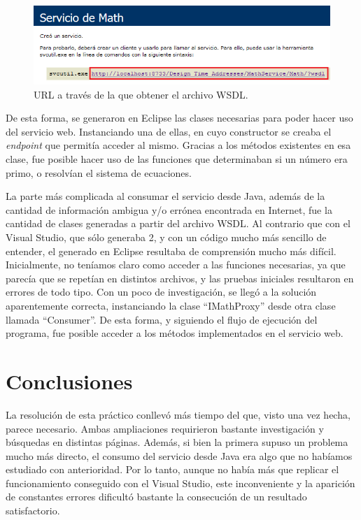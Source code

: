 \documentclass[a4paper,openright,10pt]{article}
\begin{document}
\begin{figure}[H]
	\centering
	\includegraphics[width=12cm]{URL.png}
	\caption{URL a través de la que obtener el archivo WSDL.}
	\label{fig:URL}
\end{figure}

De esta forma, se generaron en Eclipse las clases necesarias para poder hacer uso del servicio web. Instanciando una de ellas, en cuyo constructor se creaba el \textit{endpoint} que permitía acceder al mismo. Gracias a los métodos existentes en esa clase, fue posible hacer uso de las funciones que determinaban si un número era primo, o resolvían el sistema de ecuaciones.

La parte más complicada al consumar el servicio desde Java, además de la cantidad de información ambigua y/o errónea encontrada en Internet, fue la cantidad de clases generadas a partir del archivo WSDL. Al contrario que con el Visual Studio, que sólo generaba 2, y con un código mucho más sencillo de entender, el generado en Eclipse resultaba de comprensión mucho más difícil. Inicialmente, no teníamos claro como acceder a las funciones necesarias, ya que parecía que se repetían en distintos archivos, y las pruebas iniciales resultaron en errores de todo tipo. Con un poco de investigación, se llegó a la solución aparentemente correcta, instanciando la clase ``IMathProxy'' desde otra clase llamada ``Consumer''. De esta forma, y siguiendo el flujo de ejecución del programa, fue posible acceder a los métodos implementados en el servicio web.


\section{Conclusiones}

La resolución de esta práctico conllevó más tiempo del que, visto una vez hecha, parece necesario. Ambas ampliaciones requirieron bastante investigación y búsquedas en distintas páginas. Además, si bien la primera supuso un problema mucho más directo, el consumo del servicio desde Java era algo que no habíamos estudiado con anterioridad. Por lo tanto, aunque no había más que replicar el funcionamiento conseguido con el Visual Studio, este inconveniente y la aparición de constantes errores dificultó bastante la consecución de un resultado satisfactorio.
\end{document}
